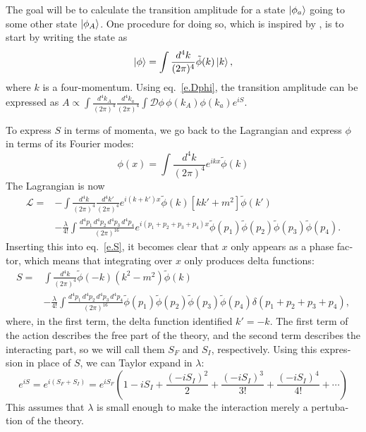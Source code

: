 \begin{english}
The goal will be to calculate the transition amplitude for a state $\left| \phi_a \right\rangle$ going to some other state $\left| \phi_A \right\rangle$. One procedure for doing so, which is inspired by \cite{wiki.feydiag}, is to start by writing the state as
\[\left| \phi \right\rangle=\int\frac{d^4k}{(2\pi)^4}\tilde\phi(k)\left| k \right\rangle,\]
where $k$ is a four-momentum. Using eq.~\eqref{e.Dphi}, the transition amplitude can be expressed as
\(A\propto\int\frac{d^4k_A}{(2\pi)^4}\frac{d^4k_a}{(2\pi)^4}\int\mathcal D\phi\,\phi(k_A)\phi(k_a)e^{iS}.\label{transa}\)

To express $S$ in terms of momenta, we go back to the Lagrangian and express $\phi$ in terms of its Fourier modes:
\[\phi(x)=\int\frac{d^4k}{(2\pi)^4}e^{ikx}\tilde\phi(k)\]
The Lagrangian is now
\begin{align*}\mathcal L=&-\int\frac{d^4k}{(2\pi)^4}\frac{d^4k\prime}{(2\pi)^4} e^{i(k+k\prime)x}\tilde\phi(k)[kk\prime +m^2]\tilde\phi(k\prime)\\
&-\frac{\lambda}{4!}\int\frac{d^4p_1\,d^4p_2\,d^4p_3\,d^4p_4}{(2\pi)^{16}}e^{i(p_1+p_2+p_3+p_4)x}\tilde\phi(p_1)\tilde\phi(p_2)\tilde\phi(p_3)\tilde\phi(p_4).
\end{align*}
Inserting this into eq.~\eqref{e.S}, it becomes clear that $x$ only appears as a phase factor, which means that integrating over $x$ only produces delta functions:
\begin{align*}
S=&\int\frac{d^4k}{(2\pi)^4}\tilde\phi(-k)(k^2-m^2)\tilde\phi(k)\\
&-\frac{\lambda}{4!}\int\frac{d^4p_1\,d^4p_2\,d^4p_3\,d^4p_4}{(2\pi)^{16}}\tilde\phi(p_1)\tilde\phi(p_2)\tilde\phi(p_3)\tilde\phi(p_4)\delta(p_1+p_2+p_3+p_4),
\end{align*}
where, in the first term, the delta function identified $k\prime=-k$. The first term of the action describes the free part of the theory, and the second term describes the interacting part, so we will call them $S_F$ and $S_I$, respectively. Using this expression in place of $S$, we can Taylor expand in $\lambda$:
\[e^{iS}=e^{i(S_F+S_I)}=e^{iS_F}\left(1-iS_I+\frac{(-iS_I)^2}{2}+\frac{(-iS_I)^3}{3!}+\frac{(-iS_I)^4}{4!}+\cdots\right)\]
This assumes that $\lambda$ is small enough to make the interaction merely a pertubation of the theory.



\end{english}
